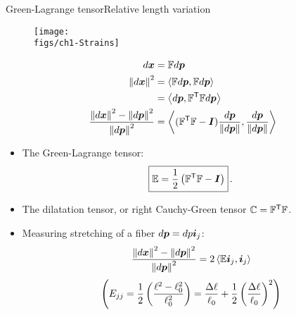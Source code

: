 \begin{frame}{Green-Lagrange tensor}{Relative length variation}

\begin{overprint}


\begin{figure}
\centering\texttt{[image: \\figs/ch1-Strains]}
\end{figure}
\begin{displaymath}
\begin{split}
d{\boldsymbol{x}} &={\mathbb F}d{\boldsymbol{p}} \\
\left\|d{\boldsymbol{x}}\right\|^2 &=\left\langle{{\mathbb F}d{\boldsymbol{p}},{\mathbb F}d{\boldsymbol{p}}}\right\rangle \\
&=\left\langle{d{\boldsymbol{p}},{\mathbb F}^{\sf T}{\mathbb F}d{\boldsymbol{p}}}\right\rangle \\
\frac{\left\|d{\boldsymbol{x}}\right\|^2-\left\|d{\boldsymbol{p}}\right\|^2}{\left\|d{\boldsymbol{p}}\right\|^2} &=\left\langle{({\mathbb F}^{\sf T}{\mathbb F}-{\boldsymbol I})\frac{d{\boldsymbol{p}}}{\left\|d{\boldsymbol{p}}\right\|},\frac{d{\boldsymbol{p}}}{\left\|d{\boldsymbol{p}}\right\|}}\right\rangle
\end{split}
\end{displaymath}


\begin{itemize}
\item The Green-Lagrange tensor:
\begin{displaymath}
\boxed{{\mathbb{E}}=\frac{1}{2}\left({\mathbb F}^{\sf T}{\mathbb F}-{\boldsymbol I}\right)}\,.
\end{displaymath}
\item The dilatation tensor, or right Cauchy-Green tensor $\mathbb{C}={\mathbb F}^{\sf T}{\mathbb F}$.
\item Measuring stretching of a fiber $d{\boldsymbol{p}}=dp{\boldsymbol{i}}_j$:
\begin{displaymath}
\frac{\left\|d{\boldsymbol{x}}\right\|^2-\left\|d{\boldsymbol{p}}\right\|^2}{\left\|d{\boldsymbol{p}}\right\|^2}=2\left\langle{{\mathbb{E}}{\boldsymbol{i}}_j,{\boldsymbol{i}}_j}\right\rangle
\end{displaymath}
\begin{displaymath}
\left(E_{jj}=\frac{1}{2}\left(\frac{\ell^2-\ell_0^2}{\ell_0^2}\right)=\frac{\Delta\ell}{\ell_0}+\frac{1}{2}\left(\frac{\Delta\ell}{\ell_0}\right)^2\right)
\end{displaymath}
\end{itemize}

\end{overprint}

\end{frame}

